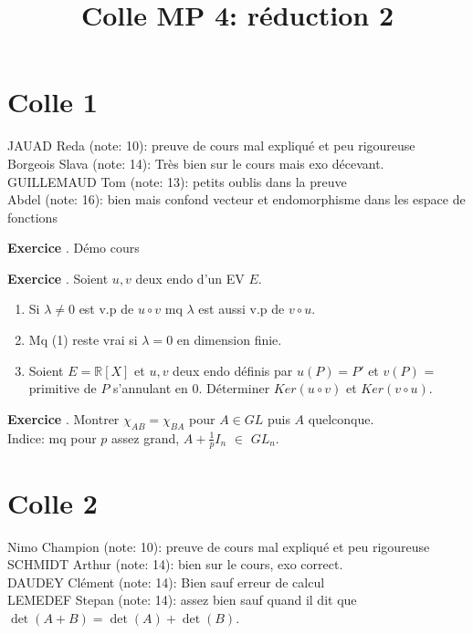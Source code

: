 \documentclass[10pt,a4paper]{article}
\title{Colle MP 4: réduction 2}
\newcounter{question}
\newcounter{exo}
\newenvironment{exo}{\vspace{0.5cm}\setcounter{question}{0}\addtocounter{exo}{1} \noindent \textbf{Exercice \theexo}. \normalsize }{\par}
\begin{document}
	\maketitle
	
	\section*{Colle 1}
	JAUAD Reda (note: 10): preuve de cours mal expliqué et peu rigoureuse\\
	Borgeois Slava (note: 14): Très bien sur le cours mais exo décevant.\\
	GUILLEMAUD Tom (note: 13): petits oublis dans la preuve\\
	Abdel (note: 16): bien mais confond vecteur et endomorphisme dans les espace de fonctions\\
	
	\begin{exo}
		Démo cours
	\end{exo}

	\begin{exo}
		Soient $u, v$ deux endo d'un EV $E$.
		\begin{enumerate}
			\item Si $\lambda \neq 0$ est v.p de $u \circ v$ mq $\lambda$ est aussi v.p de $v \circ u$.
			\item Mq (1) reste vrai si $\lambda = 0$ en dimension finie.
			\item Soient $E =\mathbb{R}[X]$ et $u, v$ deux endo définis par $u(P) = P'$ et $v(P)$ = primitive de $P$ s'annulant en 0.
			Déterminer $Ker(u \circ v)$ et $Ker(v \circ u)$.
		\end{enumerate}
	\end{exo}
	


	\begin{exo}
		Montrer $\chi_{AB} = \chi_{BA}$ pour $A \in GL$ puis $A$ quelconque.\\
		Indice: mq pour $p$ assez grand, $A + \frac{1}{p} I_n$ $\in$ $GL_n$.  
	\end{exo}
	
	\section*{Colle 2}
	\setcounter{exo}{0}
	Nimo Champion (note: 10): preuve de cours mal expliqué et peu rigoureuse\\
	SCHMIDT Arthur (note: 14): bien sur le cours, exo correct.\\
	DAUDEY Clément (note: 14): Bien sauf erreur de calcul\\
	LEMEDEF Stepan (note: 14): assez bien sauf quand il dit que $\det(A+B) = \det(A) + \det(B)$.\\
	
\end{document}

